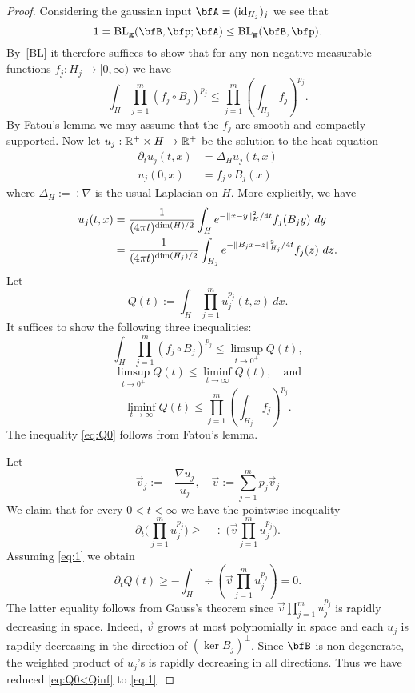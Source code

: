 \begin{proof}
Considering the gaussian input $\bfA=(\id_{H_{j}})_{j}$ we see that
\[
1 = \BLg(\bfB,\p;\bfA) \leq \BLg(\bfB,\p).
\]
By~\ref{BL} it therefore suffices to show that for any non-negative measurable functions $f_j: H_j \to [0,\infty)$ we have
\begin{equation}\label{fjpj}
\int_H \prod_{j=1}^m (f_j \circ B_j)^{p_j}
\leq
\prod_{j=1}^m (\int_{H_j} f_j)^{p_j}.
\end{equation}
By Fatou's lemma we may assume that the $f_j$ are smooth and compactly supported.
Now let $u_j: \mathbb{R}^+ \times H \to \mathbb{R}^+$ be the solution to the heat equation
\begin{align}
\label{eq:def-u}
\partial_t u_j(t,x) &= \Delta_H u_j(t,x) \\
\label{eq:initial-u}
u_j(0,x) &= f_j \circ B_j(x)
\end{align}
where $\Delta_H := \div \nabla$ is the usual Laplacian on $H$.
More explicitly, we have
\begin{equation}\label{uj-form}
\begin{split}
u_j(t,x)
&= \frac{1}{(4\pi t)^{\dim(H)/2}} \int_H e^{-\lVert x-y \rVert_H^2/4t} f_j(B_j y)\ dy
\\ &=
\frac{1}{(4\pi t)^{\dim(H_j)/2}} \int_{H_j} e^{-\lVert B_j x - z \rVert_{H_j}^2/4t} f_j(z)\ dz.
\end{split}
\end{equation}
Let
\[ Q(t) := \int_{H} \prod_{j=1}^m u_j^{p_j}(t,x)\ dx.\]
It suffices to show the following three inequalities:
\begin{equation}
\label{eq:Q0}
\int_{H} \prod_{j=1}^m (f_j \circ B_j)^{p_j}
\leq
\limsup_{t \to 0^+} Q(t),
\end{equation}
\begin{equation}
\label{eq:Q0<Qinf}
\limsup_{t \to 0^+} Q(t)
\leq
\liminf_{t \to \infty} Q(t),
\quad \text{and}
\end{equation}
\begin{equation}
\label{qinf}
\liminf_{t \to \infty} Q(t)
\leq
\prod_{j=1}^m \left(\int_{H_j} f_j\right)^{p_j}.
\end{equation}
The inequality \eqref{eq:Q0} follows from Fatou's lemma.

Let
\begin{equation}
\label{eq:def-v}
\vec v_j := - \frac{\nabla u_j}{u_j},
\quad
\vec v := \sum_{j=1}^m p_j \vec v_j
\end{equation}
We claim that for every $0<t<\infty$ we have the pointwise inequality
\begin{equation}
\label{eq:1}
\partial_t \bigl( \prod_{j=1}^m u_j^{p_j} \bigr)
\geq
- \div \bigl( \vec v \prod_{j=1}^m u_j^{p_j} \bigr).
\end{equation}
Assuming \eqref{eq:1} we obtain
\[
\partial_{t} Q(t)
\geq
- \int_{H} \div( \vec v \prod_{j=1}^m u_j^{p_j} )
=
0.
\]
The latter equality follows from Gauss's theorem since $\vec v \prod_{j=1}^m u_j^{p_j}$ is rapidly decreasing in space.
Indeed, $\vec v$ grows at most polynomially in space and each $u_{j}$ is rapdily decreasing in the direction of $(\ker B_{j})^{\perp}$.
Since $\bfB$ is non-degenerate, the weighted product of $u_{j}$'s is rapidly decreasing in all directions.
Thus we have reduced \eqref{eq:Q0<Qinf} to \eqref{eq:1}.


\end{proof}
